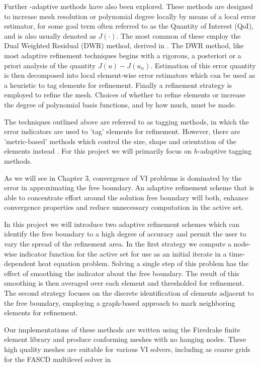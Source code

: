 \documentclass[12 pt]{report}
\begin{document}
Further -adaptive methods have also been explored. These methods are designed to increase mesh resolution or polynomial degree locally by means of a local error estimator, for some goal term often referred to as the Quantity of Interest (QoI), and is also usually denoted as $J(\cdot)$. The most common of these employ the Dual Weighted Residual (DWR) method, derived in \citet{becker_feed-back_1996}. The DWR method, like most adaptive refinement techniques begins with a rigorous, a posteriori or a priori analysis of the quantity $J(u) - J(u_n)$. Estimation of this error quantity is then decomposed into local element-wise error estimators which can be used as a heuristic to tag elements for refinement. Finally a refinement strategy is employed to refine the mesh. Choices of whether to refine elements or increase the degree of polynomial basis functions, and by how much, must be made. 

The techniques outlined above are referred to as tagging methods, in which the error indicators are used to 'tag' elements for refinement. However, there are 'metric-based' methods which control the size, shape and orientation of the elements instead \citep{alauzet_metric-based_2010}.  For this project we will primarily focus on $h$-adaptive tagging methods.


As we will see in Chapter 3, convergence of VI problems is dominated by the error in approximating the free boundary. An adaptive refinement scheme that is able to concentrate effort around the solution free boundary will both, enhance convergence properties and reduce unnecessary computation in the active set.


In this project we will introduce two adaptive refinement schemes which can identify the free boundary to a high degree of accuracy and permit the user to vary the spread of the refinement area. In the first strategy we compute a node-wise indicator function for the active set for use as an initial iterate in a time-dependent heat equation problem. Solving a single step of this problem has the effect of smoothing the indicator about the free boundary. The result of this smoothing is then averaged over each element and thresholded for refinement. The second strategy focuses on the discrete identification of elements adjacent to the free boundary, employing a graph-based approach to mark neighboring elements for refinement.

Our implementations of these methods are written using the Firedrake finite element library and produce conforming meshes with no hanging nodes. These high quality meshes are suitable for various VI solvers, including as coarse grids for the FASCD multilevel solver in \citet{bueler_full_2023}
\end{document}
